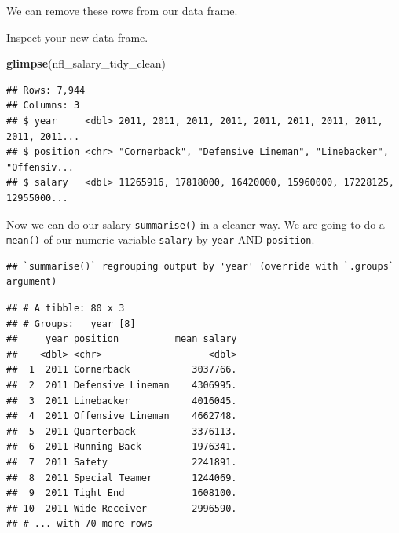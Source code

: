 \documentclass[
]{book}
\newenvironment{Shaded}{\begin{snugshade}}{\end{snugshade}}
\newcommand{\DataTypeTok}[1]{\textcolor[rgb]{0.13,0.29,0.53}{#1}}
\newcommand{\KeywordTok}[1]{\textcolor[rgb]{0.13,0.29,0.53}{\textbf{#1}}}
\newcommand{\NormalTok}[1]{#1}
\newcommand{\OperatorTok}[1]{\textcolor[rgb]{0.81,0.36,0.00}{\textbf{#1}}}
\newcommand{\StringTok}[1]{\textcolor[rgb]{0.31,0.60,0.02}{#1}}
\begin{document}
We can remove these rows from our data frame.

\begin{Shaded}
\end{Shaded}

Inspect your new data frame.

\begin{Shaded}
\begin{Highlighting}[]
\KeywordTok{glimpse}\NormalTok{(nfl_salary_tidy_clean)}
\end{Highlighting}
\end{Shaded}

\begin{verbatim}
## Rows: 7,944
## Columns: 3
## $ year     <dbl> 2011, 2011, 2011, 2011, 2011, 2011, 2011, 2011, 2011, 2011...
## $ position <chr> "Cornerback", "Defensive Lineman", "Linebacker", "Offensiv...
## $ salary   <dbl> 11265916, 17818000, 16420000, 15960000, 17228125, 12955000...
\end{verbatim}

Now we can do our salary \texttt{summarise()} in a cleaner way. We are going to do a \texttt{mean()} of our numeric variable \texttt{salary} by \texttt{year} AND \texttt{position}.

\begin{Shaded}
\end{Shaded}

\begin{verbatim}
## `summarise()` regrouping output by 'year' (override with `.groups` argument)
\end{verbatim}

\begin{verbatim}
## # A tibble: 80 x 3
## # Groups:   year [8]
##     year position          mean_salary
##    <dbl> <chr>                   <dbl>
##  1  2011 Cornerback           3037766.
##  2  2011 Defensive Lineman    4306995.
##  3  2011 Linebacker           4016045.
##  4  2011 Offensive Lineman    4662748.
##  5  2011 Quarterback          3376113.
##  6  2011 Running Back         1976341.
##  7  2011 Safety               2241891.
##  8  2011 Special Teamer       1244069.
##  9  2011 Tight End            1608100.
## 10  2011 Wide Receiver        2996590.
## # ... with 70 more rows
\end{verbatim}
\end{document}
